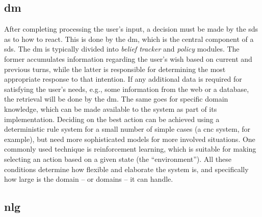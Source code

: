 
\subsection{\Acl{dm}}
\label{subsec:dialogue_management}

After completing processing the user's input, a decision must be made by the \ac{sds} as to how to react.
This is done by the \acf{dm}, which is the central component of a \ac{sds}.
The \ac{dm} is typically divided into \emph{belief tracker} and \emph{policy} modules.
The former accumulates information regarding the user's wish based on current and previous turns, while the latter is responsible for determining the most appropriate response to that intention.
If any additional data is required for satisfying the user's needs, e.g., some information from the web or a database, the retrieval will be done by the \ac{dm}.
The same goes for specific domain knowledge, which can be made available to the system as part of its implementation.
Deciding on the best action can be achieved using a deterministic rule system for a small number of simple cases (a \ac{cnc} system, for example), but need more sophisticated models for more involved situations.
One commonly used technique is reinforcement learning, which is suitable for making selecting an action based on a given state (the \enquote{environment}).
All these conditions determine how flexible and elaborate the system is, and specifically how large is the domain -- or domains -- it can handle.




\subsection{\Acl{nlg}}
\label{subsec:natural_language_generation}

